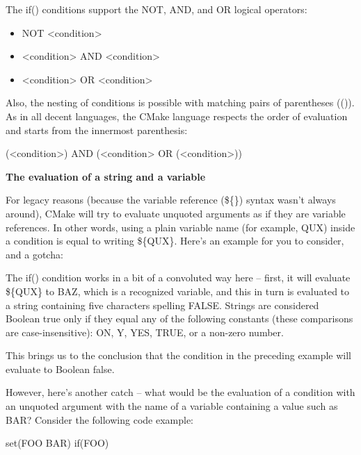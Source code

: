 The if() conditions support the NOT, AND, and OR logical operators:

\begin{itemize}
\item
NOT <condition>

\item
<condition> AND <condition>

\item
<condition> OR <condition>
\end{itemize}

Also, the nesting of conditions is possible with matching pairs of parentheses (()). As in all decent languages, the CMake language respects the order of evaluation and starts from the innermost parenthesis:

\begin{shell}
(<condition>) AND (<condition> OR (<condition>))
\end{shell}

\noindent
\textbf{The evaluation of a string and a variable}

For legacy reasons (because the variable reference (\$\{\}) syntax wasn’t always around), CMake will try to evaluate unquoted arguments as if they are variable references. In other words, using a plain variable name (for example, QUX) inside a condition is equal to writing \$\{QUX\}. Here’s an example for you to consider, and a gotcha:


The if() condition works in a bit of a convoluted way here – first, it will evaluate \$\{QUX\} to BAZ, which is a recognized variable, and this in turn is evaluated to a string containing five characters spelling FALSE. Strings are considered Boolean true only if they equal any of the following constants (these comparisons are case-insensitive): ON, Y, YES, TRUE, or a non-zero number.

This brings us to the conclusion that the condition in the preceding example will evaluate to Boolean false.

However, here’s another catch – what would be the evaluation of a condition with an unquoted argument with the name of a variable containing a value such as BAR? Consider the following code example:

\begin{cmake}
set(FOO BAR)
if(FOO)
\end{cmake}

